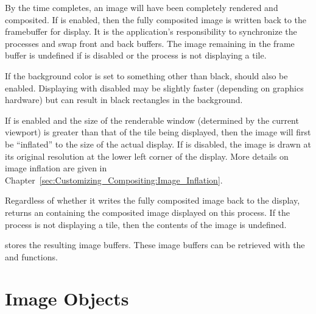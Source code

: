By the time  completes, an image will have been
completely rendered and composited.  If  is
enabled, then the fully composited image is written back to the \OpenGL
framebuffer for display.  It is the application's responsibility to
synchronize the processes and swap front and back buffers.  The image
remaining in the frame buffer is undefined if  is
disabled or the process is not displaying a tile.

If the \OpenGL background color is set to something other than black,
 should also be enabled.
Displaying with  disabled may
be slightly faster (depending on graphics hardware) but can result in black
rectangles in the background.

If  is enabled and the size of the
renderable window (determined by the current \OpenGL viewport) is greater
than that of the tile being displayed, then the image will first be
``inflated'' to the size of the actual display.  If
 is disabled, the image is drawn at its
original resolution at the lower left corner of the display.  More details
on image inflation are given in
Chapter~\ref{sec:Customizing_Compositing:Image_Inflation}.

Regardless of whether it writes the fully composited image back to the
display,  returns an  containing
the composited image displayed on this process.  If the process is not
displaying a tile, then the contents of the image is undefined.

\IceT stores the resulting image buffers.  These image buffers can
be retrieved with the  and 
functions.


\section{Image Objects}
\label{sec:Basic_Usage:Image_Objects}
